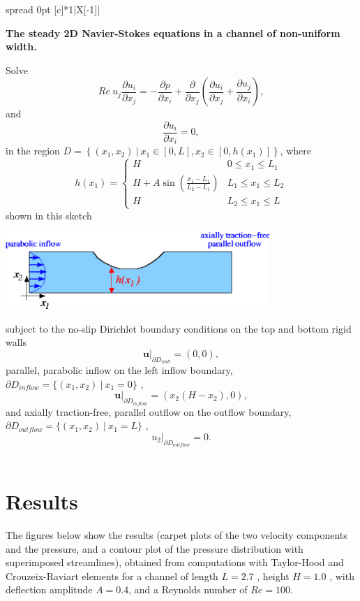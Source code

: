 \begin{center} \tabulinesep=1mm
\begin{longtabu} spread 0pt [c]{*{1}{|X[-1]}|}
\hline
\begin{center} {\bfseries The steady 2D Navier-\/\+Stokes equations in a channel of non-\/uniform width.} \end{center}  Solve \[ Re \ u_j\frac{\partial u_i}{\partial x_j} = - \frac{\partial p}{\partial x_i} + \frac{\partial }{\partial x_j} \left( \frac{\partial u_i}{\partial x_j} + \frac{\partial u_j}{\partial x_i} \right), \] and \[ \frac{\partial u_i}{\partial x_i} = 0, \] in the region $ D = \left\{(x_1,x_2) \ \bigg| \ x_1 \in [0,L], x_2 \in [0,h(x_1)] \right\} $, where \[ h(x_1) = \left\{ \begin{array}{cl} H & 0 \leq x_1 \leq L_1 \\ H + A\sin\left(\frac{x_1-L_1}{L_2-L_1}\right) & L_1 \leq x_1 \leq L_2 \\ H & L_2 \leq x_1 \leq L \end{array} \right. \] shown in this sketch  
\begin{DoxyImage}
\includegraphics[width=0.75\textwidth]{channel_sketch}
\end{DoxyImage}


subject to the no-\/slip Dirichlet boundary conditions on the top and bottom rigid walls \[ \left. \mathbf{u}\right|_{\partial D_{wall}}=(0,0), \] parallel, parabolic inflow on the left inflow boundary, $ \partial D_{inflow} = \{ (x_1,x_2) \ | \ x_1=0 \}$ , \[ \left. \mathbf{u}\right|_{\partial D_{inflow}} =\left(x_2\left(H-x_2\right),0\right), \] and axially traction-\/free, parallel outflow on the outflow boundary, $ \partial D_{outflow} = \{ (x_1,x_2) \ | \ x_1=L \}$ , \[ \left. u_2\right|_{\partial D_{outflow}}=0. \]   \\
\end{longtabu}
\end{center} 



 

\hypertarget{index_results}{}\section{Results}\label{index_results}
The figures below show the results (carpet plots of the two velocity components and the pressure, and a contour plot of the pressure distribution with superimposed streamlines), obtained from computations with Taylor-\/\+Hood and Crouzeix-\/\+Raviart elements for a channel of length $ L = 2.7$ , height $ H=1.0 $ , with deflection amplitude $ A = 0.4 $, and a Reynolds number of $ Re=100$.


